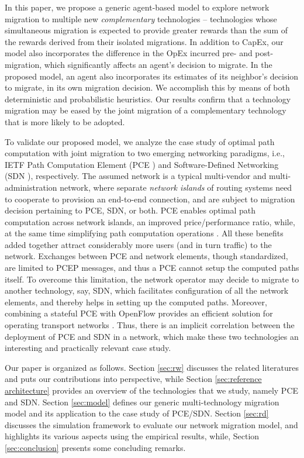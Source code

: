 \documentclass[smallextended]{svjour3}
\begin{document}
\par In this paper, we propose a generic agent-based model to explore network
migration to multiple new \emph{complementary} technologies -- technologies
whose  simultaneous migration is expected to provide greater rewards than the
sum of the rewards derived from their isolated migrations. In addition to CapEx,
our model also incorporates the difference in the OpEx incurred pre- and
post-migration, which significantly affects an agent's decision to migrate. In
the proposed model, an agent also incorporates its estimates of its neighbor's
decision to migrate, in its own migration decision. We accomplish this by means
of both deterministic and probabilistic heuristics. Our results confirm that a
technology migration may be eased by the joint migration of a complementary
technology that is more likely to be adopted.

\par To validate our  proposed model, we analyze the case study of optimal path
computation with joint migration to two emerging networking paradigms, i.e., 
IETF Path Computation Element (PCE \cite{Farrel06}) and Software-Defined
Networking (SDN \cite{SDN-onf-whitepaper}), respectively. The assumed network is
a typical multi-vendor and multi-administration network, where separate
\emph{network islands} of routing systems need to cooperate to provision an
end-to-end connection, and are subject to migration decision pertaining to PCE,
SDN, or both.
PCE enables optimal path computation across network islands, an improved
price/performance ratio, while, at the same time simplifying path computation
operations \cite{metaswitch-whitepaper}. All these benefits added together
attract considerably more users (and in turn traffic) to the network. Exchanges
between PCE and network elements, though standardized, are limited to PCEP
messages, and thus a PCE cannot setup the computed paths itself. To overcome
this limitation, the network operator may decide to migrate to another
technology, say, SDN, which facilitates configuration of all the network
elements, and thereby helps in setting up the computed paths. Moreover,
combining a stateful PCE with OpenFlow provides an efficient solution for
operating transport networks \cite{casellas}.
Thus, there is an implicit correlation between the deployment of PCE and SDN in
a network, which make these two technologies an interesting and practically
relevant case study.

Our paper is organized as follows. Section \ref{sec:rw} discusses the related
literatures and puts our contributions into perspective, while Section
\ref{sec:reference architecture} provides an overview of the technologies that
we study, namely PCE and SDN. Section \ref{sec:model} defines our generic
multi-technology migration model and its application to the case study of
PCE/SDN. Section \ref{sec:rd} discusses the simulation framework to evaluate our
network migration model, and highlights its various aspects using the empirical
results, while, Section \ref{sec:conclusion} presents some concluding remarks.
\end{document}

